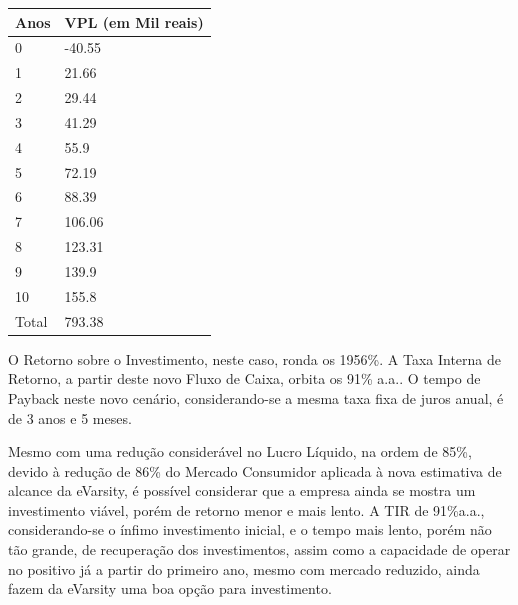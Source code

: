 \documentclass[a4paper, 12pt]{paper}
\begin{document}
	\begin{table}[ht]
		\centering
		\begin{tabular}{p{3cm}p{5cm}}
			\hline
			\cellcolor{gray}Anos &\cellcolor{gray}VPL (em Mil reais) \\ \hline
	0 & -40.55 \\ 
	1 & 21.66 \\ 
	2 & 29.44 \\ 
	3 & 41.29 \\ 
	4 & 55.9 \\ 
	5 & 72.19 \\ 
	6 & 88.39 \\ 
	7 & 106.06 \\ 
	8 & 123.31 \\ 
	9 & 139.9 \\ 
	10 & 155.8 \\ 
	Total & 793.38 \\ 
		\end{tabular}		
	\end{table}

O Retorno sobre o Investimento, neste caso, ronda os 1956\%. A Taxa Interna de Retorno, a partir deste novo Fluxo de Caixa, orbita os 91\% a.a.. O tempo de Payback neste novo cenário, considerando-se a mesma taxa fixa de juros anual, é de 3 anos e 5 meses.

Mesmo com uma redução considerável no Lucro Líquido, na ordem de 85\%, devido à redução de 86\% do Mercado Consumidor aplicada à nova estimativa de alcance da eVarsity, é possível considerar que a empresa ainda se mostra um investimento viável, porém de retorno menor e mais lento. A TIR de 91\%a.a., considerando-se o ínfimo investimento inicial, e o tempo mais lento, porém não tão grande, de recuperação dos investimentos, assim como a capacidade de operar no positivo já a partir do primeiro ano, mesmo com mercado reduzido, ainda fazem da eVarsity uma boa opção para investimento.
\end{document}
